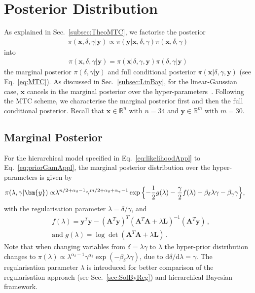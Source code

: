 \section{Posterior Distribution}
\label{sec:FirstO3Post}
As explained in Sec.~\ref{subsec:TheoMTC}, we factorise the posterior
\begin{align}
	\pi( \bm{x}, \delta, \gamma| \bm{y}) \propto \pi(\bm{y}| \bm{x},\delta,\gamma) \pi( \bm{x},  \delta,\gamma)
\end{align}
into 
\begin{align}
	\pi( \bm{x},  \delta,\gamma| \bm{y}) =\pi( \bm{x}| \delta,\gamma, \bm{y})\pi( \delta,\gamma | \bm{y})
\end{align}
the marginal posterior $\pi(\delta ,\gamma| \bm{y})$ and full conditional posterior $\pi( \bm{x}| \delta,\gamma, \bm{y})$ (see Eq.~\ref{eq:MTC}).
As discussed in Sec.~\ref{subsec:LinBay}, for the linear-Gaussian case, $\bm{x}$ cancels in the marginal posterior over the hyper-parameters~\cite{fox2016fast}.
Following the MTC scheme, we characterise the marginal posterior first and then the full conditional posterior.
Recall that $\bm{x} \in \mathbb{R}^n$ with $n = 34$ and $\bm{y} \in \mathbb{R}^m$ with $m = 30$.

\subsection{Marginal Posterior}
\label{subsec:FirstMargPost}
For the hierarchical model specified in Eq.~\ref{eq:likelihoodAppl} to Eq.~\ref{eq:priorGamAppl}, the marginal posterior distribution over the hyper-parameters is given by
\begin{align}
	\pi( \lambda,\gamma  | \bm{y}) \propto &  \lambda^{n/2 + \alpha_{\delta}-1} \gamma^{m/2 + \alpha_{\delta} + \alpha_{\gamma}-1}   \exp{ \Bigl\{ - \frac{1}{2} g ( \lambda) - \frac{\gamma}{2} f ( \lambda) - \beta_{\delta} \lambda  \gamma - \beta_{\gamma} \gamma \Bigr\}},
	\label{eq:MargPostAppl}
\end{align}
with the regularisation parameter $\lambda = \delta / \gamma$, and
\begin{subequations}
	\begin{align}
		&f ( \lambda) = \bm{y}^T \bm{y} - (\bm{A}^T \bm{y})^T (\bm{A}^T  \bm{A} + \lambda \bm{L})^{-1} (\bm{A}^T \bm{y})  \label{eq:fAppl} \, ,  \\
		&\text{and } g(\lambda) = \log \det (\bm{A}^T  \bm{A} + \lambda \bm{L}) \label{eq:gAppl} \, .
	\end{align}
\end{subequations}
Note that when changing variables from $\delta = \lambda \gamma$ to $\lambda$ the hyper-prior distribution changes to $\pi(\lambda) \propto \lambda^{\alpha_{\delta}-1} \gamma^{\alpha_{\delta}} \exp{(- \beta_{\delta} \lambda  \gamma)} $, due to $\text{d}\delta / \text{d} \lambda = \gamma$.
The regularisation parameter $\lambda$ is introduced for better comparison of the regularisation approach (see Sec.~\ref{sec:SolByReg}) and hierarchical Bayesian framework.


